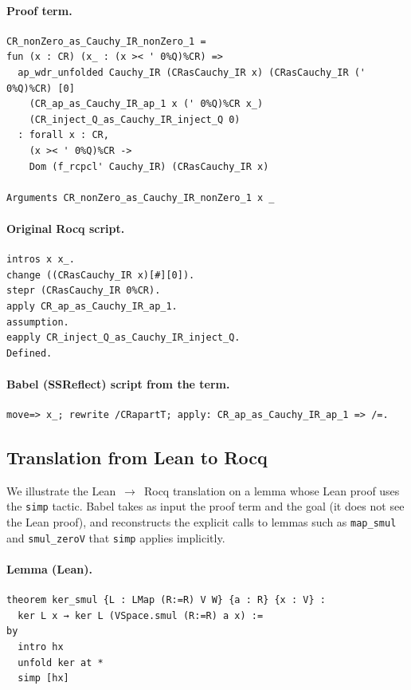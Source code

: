 \documentclass{article}
\begin{document}
\paragraph{Proof term.}
\begin{verbatim}
CR_nonZero_as_Cauchy_IR_nonZero_1 =
fun (x : CR) (x_ : (x >< ' 0%Q)%CR) =>
  ap_wdr_unfolded Cauchy_IR (CRasCauchy_IR x) (CRasCauchy_IR (' 0%Q)%CR) [0]
    (CR_ap_as_Cauchy_IR_ap_1 x (' 0%Q)%CR x_)
    (CR_inject_Q_as_Cauchy_IR_inject_Q 0)
  : forall x : CR,
    (x >< ' 0%Q)%CR ->
    Dom (f_rcpcl' Cauchy_IR) (CRasCauchy_IR x)

Arguments CR_nonZero_as_Cauchy_IR_nonZero_1 x _
\end{verbatim}

\paragraph{Original Rocq script.}
\begin{verbatim}
intros x x_.
change ((CRasCauchy_IR x)[#][0]).
stepr (CRasCauchy_IR 0%CR).
apply CR_ap_as_Cauchy_IR_ap_1.
assumption.
eapply CR_inject_Q_as_Cauchy_IR_inject_Q.
Defined.
\end{verbatim}

\paragraph{Babel (SSReflect) script from the term.}
\begin{verbatim}
move=> x_; rewrite /CRapartT; apply: CR_ap_as_Cauchy_IR_ap_1 => /=.
\end{verbatim}

\subsection{Translation from Lean to Rocq}
\label{app:leanrocq}

We illustrate the Lean~$\to$~Rocq translation on a lemma whose Lean proof uses the \texttt{simp} tactic. Babel takes as input the proof term and the goal (it does not see the Lean proof), and reconstructs the explicit calls to lemmas such as \texttt{map\_smul} and \texttt{smul\_zeroV} 
that \texttt{simp} applies implicitly.

\paragraph{Lemma (Lean).}
\begin{verbatim}
theorem ker_smul {L : LMap (R:=R) V W} {a : R} {x : V} :
  ker L x → ker L (VSpace.smul (R:=R) a x) :=
by
  intro hx
  unfold ker at *
  simp [hx]
\end{verbatim}
\end{document}
